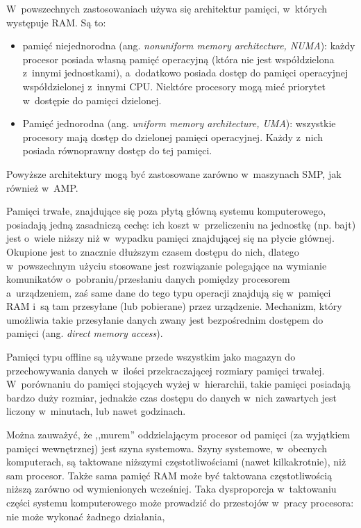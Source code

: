\documentclass[11pt,makeidx]{mwart}
\begin{document}
\par
%
\indent
	W~powszechnych zastosowaniach używa się architektur pamięci, w~których występuje RAM. Są to:
	\begin{itemize}
		\item pamięć niejednorodna (ang. \emph{non\dywiz uniform memory architecture, NUMA}): każdy procesor posiada własną pamięć operacyjną
			(która nie jest współdzielona z~innymi jednostkami), a~dodatkowo posiada dostęp do pamięci operacyjnej współdzielonej z~innymi CPU.
			Niektóre procesory mogą mieć priorytet w~dostępie do pamięci dzielonej.
		\item Pamięć jednorodna (ang. \emph{uniform memory architecture, UMA}): wszystkie procesory mają dostęp do dzielonej pamięci operacyjnej.
			Każdy z~nich posiada równoprawny dostęp do tej pamięci.
	\end{itemize}
	Powyższe architektury mogą być zastosowane zarówno w~maszynach SMP, jak również w~AMP.
\par
%
\indent
	Pamięci trwałe, znajdujące się poza płytą główną systemu komputerowego, posiadają jedną zasadniczą cechę: ich koszt w~przeliczeniu na jednostkę
	(np. bajt) jest o~wiele niższy niż w~wypadku pamięci znajdującej się na płycie głównej. Okupione jest to znacznie dłuższym czasem dostępu 
	do nich, dlatego w~powszechnym użyciu stosowane jest rozwiązanie polegające na wymianie komunikatów o~pobraniu/przesłaniu danych pomiędzy
	procesorem a~urządzeniem, zaś same dane do tego typu operacji znajdują się w~pamięci RAM i~są tam przesyłane (lub pobierane) przez urządzenie.
	Mechanizm, który umożliwia takie przesyłanie danych zwany jest bezpośrednim dostępem do pamięci (ang. \emph{direct memory access}).
\par
%
\indent
	Pamięci typu off\dywiz line są używane przede wszystkim jako magazyn do przechowywania danych w~ilości przekraczającej rozmiary pamięci trwałej.
	W~porównaniu do pamięci stojących wyżej w~hierarchii, takie pamięci posiadają bardzo duży rozmiar, jednakże czas dostępu do danych w~nich
	zawartych jest liczony w~minutach, lub nawet godzinach.
\par
%
\indent
	Można zauważyć, że ,,murem'' oddzielającym procesor od pamięci (za wyjątkiem pamięci wewnętrznej) jest szyna systemowa.
	Szyny systemowe, w~obecnych komputerach, są taktowane niższymi częstotliwościami (nawet kilkakrotnie), niż sam procesor.
	Także sama pamięć RAM może być taktowana częstotliwością niższą zarówno od wymienionych wcześniej.
	Taka dysproporcja w~taktowaniu części systemu komputerowego może prowadzić do przestojów w~pracy procesora: nie może wykonać żadnego działania,
\end{document}
